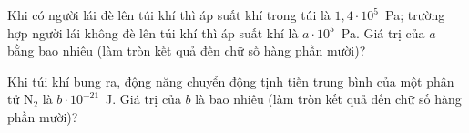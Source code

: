 \begin{ex}
\begin{center}
		\end{center}
		Khi có người lái đè lên túi khí thì áp suất khí trong túi là $1{,}4\cdot 10^5$~Pa; trường hợp người lái không đè lên túi khí thì áp suất khí là $a\cdot 10^5$~Pa. Giá trị của $a$ bằng bao nhiêu (làm tròn kết quả đến chữ số hàng phần mười)?
		\par
	\end{ex}

	\begin{ex}%
		\label{NgheAn-SoGD-Lan1-III2}Khi túi khí bung ra, động năng chuyển động tịnh tiến trung bình của một phân tử $\text{N}_2$ là $b\cdot 10^{-21}$~J. Giá trị của $b$ là bao nhiêu (làm tròn kết quả đến chữ số hàng phần mười)?
		\par
	\end{ex}

